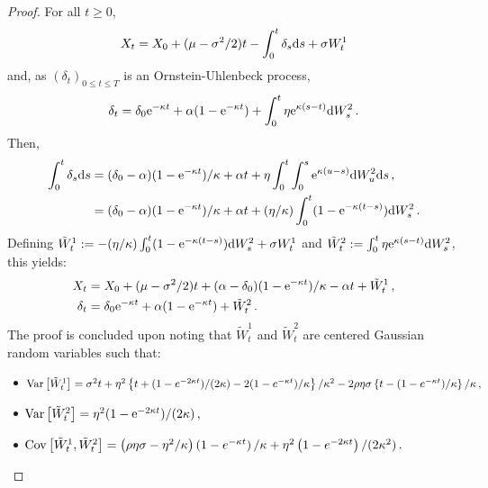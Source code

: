 \begin{proof}
For all $t\ge 0$,
\[
X_t = X_0 + (\mu-\sigma^2/2)t - \int_0^t\delta_s\mathrm{d} s +\sigma W_t^1
\]
and, as $(\delta_t)_{0\le t\le T}$ is an Ornstein-Uhlenbeck process,
\[
\delta_t = \delta_0\mathrm{e}^{-\kappa t} + \alpha(1-\mathrm{e}^{-\kappa t}) + \int_0^t \eta \mathrm{e}^{\kappa(s-t)}\mathrm{d} W^2_s\,.
\]
Then,
\begin{align*}
\int_0^t\delta_s\mathrm{d} s &= (\delta_0-\alpha)(1-\mathrm{e}^{-\kappa t})/\kappa + \alpha t + \eta\int_0^t\int_0^s\mathrm{e}^{\kappa(u-s)}\mathrm{d} W^2_u\mathrm{d} s\,,\\
&=(\delta_0-\alpha)(1-\mathrm{e}^{-\kappa t})/\kappa + \alpha t + (\eta/\kappa) \int_0^t (1-\mathrm{e}^{-\kappa (t-s)}) \mathrm{d} W^2_s\,.
\end{align*}
Defining $\tilde{W}^1_t := - (\eta/\kappa) \int_0^t (1-\mathrm{e}^{-\kappa (t-s)}) \mathrm{d} W^2_s+\sigma W_t^1$ and $\tilde{W}_t^2:= \int_0^t \eta \mathrm{e}^{\kappa(s-t)}\mathrm{d} W^2_s$, this yields:
\begin{align*}
X_t &= X_0 +  (\mu-\sigma^2/2)t + (\alpha-\delta_0)(1-\mathrm{e}^{-\kappa t})/\kappa - \alpha t + \tilde{W}_t^1\,,\\
\delta_t &= \delta_0\mathrm{e}^{-\kappa t} + \alpha(1-\mathrm{e}^{-\kappa t}) + \tilde{W}^2_t\,.
\end{align*}
The proof is concluded upon noting that $\tilde{W}^1_t$ and $\tilde{W}^2_t$ are centered Gaussian random variables such that:
\begin{itemize}
\item $\!\!\mathrm{Var}\left[\tilde{W}^1_t\right] = \sigma^2  t + \eta^2\left\{ t + (1-e^{-2\kappa t})/(2\kappa) - 2(1-e^{-\kappa  t})/\kappa\right\}/\kappa^2 - 2\rho \eta \sigma\left\{ t - (1-e^{-\kappa  t})/\kappa \right\}/\kappa\,,$
\item $\!\!\mathrm{Var}\left[\tilde{W}^2_t\right] = \eta^2(1-\mathrm{e}^{-2\kappa t})/(2\kappa)\,,$
\item $\!\!\mathrm{Cov}\left[\tilde{W}^1_t,\tilde{W}^2_t\right] = \left(\rho \eta\sigma-\eta^2/\kappa\right)\left(1-e^{-\kappa t} \right)/\kappa + \eta^2 \left(1-e^{-2\kappa t} \right)/(2\kappa^2)\,.$
\end{itemize}
\end{proof}

